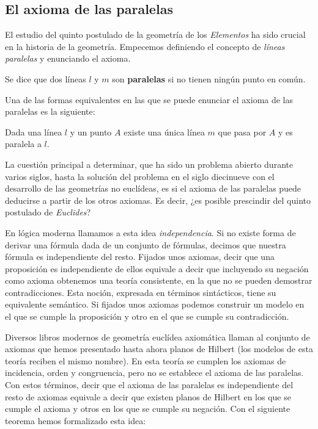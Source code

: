 \subsection{El axioma de las paralelas}

El estudio del quinto postulado de la geometría de los \textit{Elementos} ha
sido crucial en la historia de la geometría. Empecemos definiendo el
concepto de \textit{líneas paralelas} y enunciando el axioma.

\begin{defin*}
	Se dice que dos líneas $l$ y $m$ son \textbf{paralelas} si no tienen ningún
	punto en común.
\end{defin*}

Una de las formas equivalentes en las que se puede enunciar el axioma de las
paralelas es la siguiente:


\begin{axb}[P]\label{ax:P}
	Dada una línea $l$ y un punto $A$ existe una única línea $m$ que pasa por
	$A$ y es paralela a $l$.
\end{axb}


La cuestión principal a determinar, que ha sido un problema abierto durante
varios siglos, hasta la solución del problema en el siglo diecinueve con el
desarrollo de las geometrías no euclídeas, es si el axioma de las paralelas
puede deducirse a partir de los otros axiomas. Es decir, ¿es posible prescindir
del quinto postulado de \textit{Euclides}?

En lógica moderna llamamos a esta idea \textit{independencia}. Si no existe forma
de derivar una fórmula dada de un conjunto de fórmulas, decimos que nuestra
fórmula es independiente del resto. Fijados unos axiomas, decir que una
proposición es independiente de ellos equivale a decir que incluyendo su
negación como axioma obtenemos una teoría consistente, en la que no se pueden
demostrar contradicciones. Esta noción, expresada en términos sintácticos, tiene
su equivalente semántico. Si fijados unos axiomas podemos construir un
modelo en el que se cumple la proposición y otro en el que se cumple su
contradicción.

Diversos libros modernos de geometría euclídea axiomática llaman al conjunto de
axiomas que hemos presentado hasta ahora planos de Hilbert (los modelos
de esta teoría reciben el mismo nombre). En esta teoría se cumplen los axiomas
de incidencia, orden y congruencia, pero no se establece el axioma de las
paralelas. Con estos términos, decir que el axioma de las paralelas es
independiente del resto de axiomas equivale a decir que existen planos de
Hilbert en los que se cumple el axioma y otros en los que se cumple su negación.
Con el siguiente teorema hemos formalizado esta idea:

